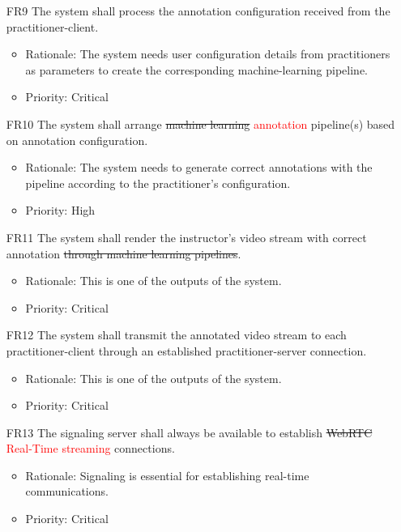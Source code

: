 \documentclass[12pt]{article}
\begin{document}
\begin{itemize}
    \item[FR9] The system shall process the annotation configuration received from the practitioner-client. \label{FR9}
    \begin{itemize}
        \item Rationale: The system needs user configuration details from practitioners as parameters to create the corresponding machine-learning pipeline.
        \item Priority: Critical
    \end{itemize}
\end{itemize}
\begin{itemize}
    \item[FR10] The system shall arrange \sout{machine learning} \textcolor{red}{annotation} pipeline(s) based on annotation configuration. \label{FR10}
    \begin{itemize}
        \item Rationale: The system needs to generate correct annotations with the pipeline according to the practitioner’s configuration.
        \item Priority: High
    \end{itemize}
\end{itemize}
\begin{itemize}
    \item[FR11] The system shall render the instructor’s video stream with correct annotation \sout{through machine learning pipelines}. \label{FR11}
    \begin{itemize}
        \item Rationale: This is one of the outputs of the system.
        \item Priority: Critical
    \end{itemize}
\end{itemize}
\begin{itemize}
    \item[FR12] The system shall transmit the annotated video stream to each practitioner-client through an established practitioner-server connection. \label{FR12}
    \begin{itemize}
        \item Rationale: This is one of the outputs of the system.
        \item Priority: Critical
    \end{itemize}
\end{itemize}
\begin{itemize}
    \item[FR13] The signaling server shall always be available to establish \sout{WebRTC} \textcolor{red}{Real-Time streaming} connections. \label{FR13}
    \begin{itemize}
        \item Rationale: Signaling is essential for establishing real-time communications.
        \item Priority: Critical
    \end{itemize}
\end{itemize}
\end{document}
